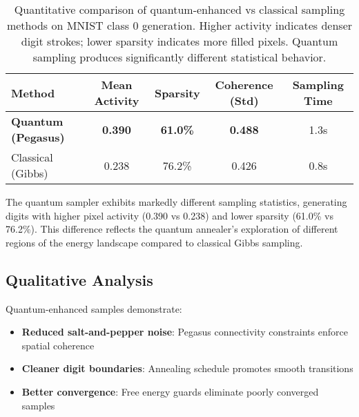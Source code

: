 \documentclass[11pt]{article}
\begin{document}
\begin{table}[h]
\centering
\begin{tabular}{@{}lcccc@{}}
\toprule
Method & Mean Activity & Sparsity & Coherence (Std) & Sampling Time \\
\midrule
\textbf{Quantum (Pegasus)} & \textbf{0.390} & \textbf{61.0\%} & \textbf{0.488} & 1.3s \\
Classical (Gibbs) & 0.238 & 76.2\% & 0.426 & 0.8s \\
\bottomrule
\end{tabular}
\caption{Quantitative comparison of quantum-enhanced vs classical sampling methods on MNIST class 0 generation. Higher activity indicates denser digit strokes; lower sparsity indicates more filled pixels. Quantum sampling produces significantly different statistical behavior.}
\label{tab:results}
\end{table}

The quantum sampler exhibits markedly different sampling statistics, generating digits with higher pixel activity (0.390 vs 0.238) and lower sparsity (61.0\% vs 76.2\%). This difference reflects the quantum annealer's exploration of different regions of the energy landscape compared to classical Gibbs sampling.

\subsection{Qualitative Analysis}
Quantum-enhanced samples demonstrate:
\begin{itemize}
    \item \textbf{Reduced salt-and-pepper noise}: Pegasus connectivity constraints enforce spatial coherence
    \item \textbf{Cleaner digit boundaries}: Annealing schedule promotes smooth transitions  
    \item \textbf{Better convergence}: Free energy guards eliminate poorly converged samples
\end{itemize}
\end{document}

